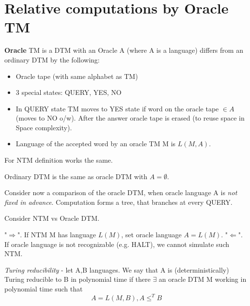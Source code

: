 \section{\texorpdfstring{Relative computations by Oracle TM}{Relative computations by Oracle TM}}
\vspace{5mm}
\large

\begin{definition}[Oracle TM]
	\textbf{Oracle} TM is a DTM with an Oracle A (where A is a language) differs from an ordinary DTM by the following:
	\begin{itemize}
		\item Oracle tape (with same alphabet as TM)
		\item 3 special states: QUERY, YES, NO
		\item In QUERY state TM moves to YES state if word on the oracle tape $\in A$ (moves to NO o/w).
			After the answer oracle tape is erased (to reuse space in Space complexity).
		\item Language of the accepted word by an oracle TM M is $L(M, A)$.
	\end{itemize}
\end{definition}

\begin{note}
	For NTM definition works the same.
\end{note}

\begin{note}
	Ordinary DTM is the same as oracle DTM with $A = \emptyset$.
\end{note}

Consider now a comparison of the oracle DTM, when oracle language A is \emph{not fixed in advance}.
Computation forms a tree, that branches at every QUERY.

\begin{observation}
	Consider NTM vs Oracle DTM.

	"$\Rightarrow$". If NTM M has language $L(M)$, set oracle language $A = L(M)$.
	"$\Leftarrow$". If oracle language is not recognizable (e.g. HALT), we cannot simulate such NTM.
\end{observation}

\begin{definition}
	\emph{Turing reducibility} - let A,B languages.
	We say that A is (deterministically) Turing reducible to B in polynomial time if there $\exists$ an oracle DTM M working in polynomial time such that
	\[ A = L(M, B), A \leq^T B \]
\end{definition}

